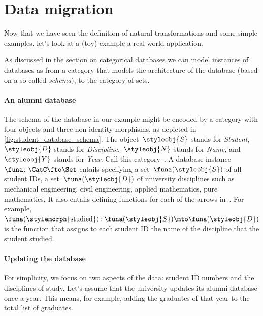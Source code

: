 
\section{Data migration}

Now that we have seen the definition of natural transformations and some simple examples, let's look at a (toy) example a real-world application. 

As discussed in the section on categorical databases 
we can model instances of databases as  from a category that models the architecture of the database (based on a so-called \emph{schema}), to the category of sets.

\paragraph{An alumni database}

%
\begin{marginfigure}
    \centering
    \caption{The schema of an alumni database.}
    \label{fig:student_database_schema}
\end{marginfigure}
%

The schema of the database in our example might be encoded by a category with four objects and three non-identity morphisms, as depicted in \cref{fig:student_database_schema}.
The object~$\styleobj{S}$ stands for \emph{Student},~$\styleobj{D}$ stands for \emph{Discipline},~$\styleobj{N}$ stands for \emph{Name}, and~$\styleobj{Y}$ stands for \emph{Year}.
Call this category~\CatC.
A database instance~$\funa \colon \CatC \fto \Set$ entails specifying a set~$\funa(\styleobj{S})$ of all student IDs, a set~$\funa(\styleobj{D})$ of university disciplines such as mechanical engineering, civil engineering, applied mathematics, pure mathematics, \etc
It also entails defining functions for each of the arrows in~\CatC.
For example,~$\funa(\stylemorph{\text{studied}}) \colon \funa(\styleobj{S}) \mto \funa(\styleobj{D})$ is the function that assigns to each student ID the name of the discipline that the student studied.

\paragraph{Updating the database}

For simplicity, we focus on two aspects of the data: student ID numbers and the disciplines of study.
Let's assume that the university updates its alumni database once a year.
This means, for example, adding the graduates of that year to the total list of graduates.

